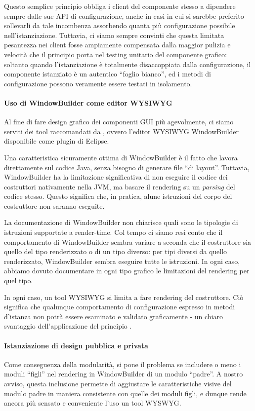 Questo semplice principio obbliga i client del componente stesso a dipendere sempre dalle sue API di configurazione, anche in casi in cui si sarebbe preferito sollevarli da tale incombenza assorbendo quanta più configurazione possibile nell'istanziazione.
Tuttavia, ci siamo sempre convinti che questa limitata pesantezza nei client fosse ampiamente compensata dalla maggior pulizia e velocità che il principio porta nel testing unitario del componente grafico: soltanto quando l'istanziazione è totalmente disaccoppiata dalla configurazione, il componente istanziato è un autentico ``foglio bianco'', ed i metodi di configurazione possono veramente essere testati in isolamento.


\paragraph{Uso di WindowBuilder come editor WYSIWYG}
Al fine di fare design grafico dei componenti GUI più agevolmente, ci siamo serviti dei tool raccomandati da \cite{bettini2019tdd}, ovvero l'editor WYSIWYG WindowBuilder disponibile come plugin di Eclipse. 

Una caratteristica sicuramente ottima di WindowBuilder è il fatto che lavora direttamente sul codice Java, senza bisogno di generare file ``di layout''.
Tuttavia, WindowBuilder ha la limitazione significativa di non eseguire il codice dei costruttori nativamente nella JVM, ma basare il rendering su un \emph{parsing} del codice stesso. Questo significa che, in pratica, alune istruzioni del corpo del costruttore non saranno eseguite.

La documentazione di WindowBuilder non chiarisce quali sono le tipologie di istruzioni supportate a render-time. Col tempo ci siamo resi conto che il comportamento di WindowBuilder sembra variare a seconda che il costruttore sia quello del tipo renderizzato o di un tipo diverso: per tipi diversi da quello renderizzato, WindowBuilder sembra eseguire tutte le istruzioni. In ogni caso, abbiamo dovuto documentare in ogni tipo grafico le limitazioni del rendering per quel tipo.

In ogni caso, un tool WYSIWYG si limita a fare rendering del costruttore. Ciò significa che qualunque comportamento di configurazione espresso in metodi d'istanza non potrà essere esaminato e validato graficamente - un chiaro svantaggio dell'applicazione del principio .


\paragraph{Istanziazione di design pubblica e privata}\label{par:pubPrivInst}
Come conseguenza della modularità, si pone il problema se includere o meno i moduli ``figli'' nel rendering in WindowBuilder di un modulo ``padre''. A nostro avviso, questa inclusione permette di aggiustare le caratteristiche visive del modulo padre in maniera consistente con quelle dei moduli figli, e dunque rende ancora più sensato e conveniente l'uso un tool WYSWYG.


